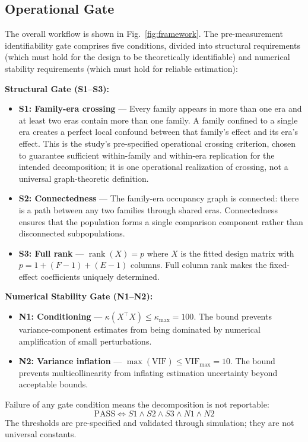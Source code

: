 \documentclass{ieeeaccess}
\theoremstyle{definition}
\theoremstyle{plain}
\begin{document}
\subsection{Operational Gate}
The overall workflow is shown in Fig.~\ref{fig:framework}. The pre-measurement identifiability gate comprises five conditions, divided into structural requirements (which must hold for the design to be theoretically identifiable) and numerical stability requirements (which must hold for reliable estimation):

\textbf{Structural Gate (S1--S3):}
\begin{itemize}
\item \textbf{S1: Family-era crossing} --- Every family appears in more than one era and at least two eras contain more than one family. A family confined to a single era creates a perfect local confound between that family's effect and its era's effect. This is the study's pre-specified operational crossing criterion, chosen to guarantee sufficient within-family and within-era replication for the intended decomposition; it is one operational realization of crossing, not a universal graph-theoretic definition.
\item \textbf{S2: Connectedness} --- The family-era occupancy graph is connected: there is a path between any two families through shared eras. Connectedness ensures that the population forms a single comparison component rather than disconnected subpopulations.
\item \textbf{S3: Full rank} --- $\operatorname{rank}(X) = p$ where $X$ is the fitted design matrix with $p = 1 + (F-1) + (E-1)$ columns. Full column rank makes the fixed-effect coefficients uniquely determined.
\end{itemize}

\textbf{Numerical Stability Gate (N1--N2):}
\begin{itemize}
\item \textbf{N1: Conditioning} --- $\kappa(X^\top X) \leq \kappa_{\max} = 100$. The bound prevents variance-component estimates from being dominated by numerical amplification of small perturbations.
\item \textbf{N2: Variance inflation} --- $\max(\text{VIF}) \leq \text{VIF}_{\max} = 10$. The bound prevents multicollinearity from inflating estimation uncertainty beyond acceptable bounds.
\end{itemize}

Failure of any gate condition means the decomposition is not reportable:
\[
\boxed{\text{PASS} \iff S1 \land S2 \land S3 \land N1 \land N2}
\]
The thresholds are pre-specified and validated through simulation; they are not universal constants.
\end{document}
